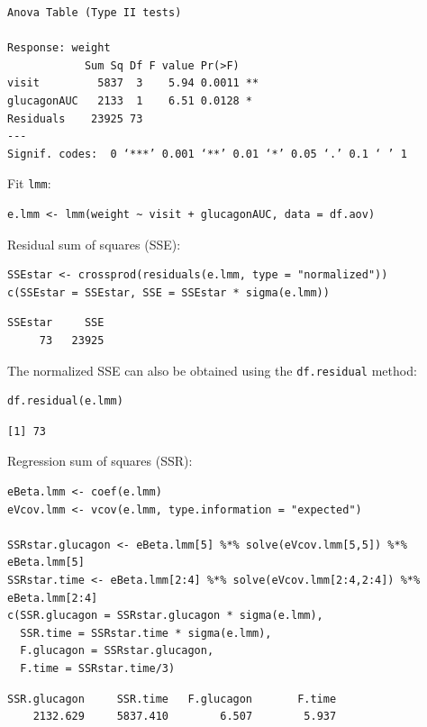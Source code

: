\documentclass[12pt]{article}
\begin{document}
\begin{verbatim}
Anova Table (Type II tests)

Response: weight
            Sum Sq Df F value Pr(>F)   
visit         5837  3    5.94 0.0011 **
glucagonAUC   2133  1    6.51 0.0128 * 
Residuals    23925 73                  
---
Signif. codes:  0 ‘***’ 0.001 ‘**’ 0.01 ‘*’ 0.05 ‘.’ 0.1 ‘ ’ 1
\end{verbatim}


Fit \texttt{lmm}:
\lstset{language=r,label= ,caption= ,captionpos=b,numbers=none}
\begin{lstlisting}
e.lmm <- lmm(weight ~ visit + glucagonAUC, data = df.aov)
\end{lstlisting}

Residual sum of squares (SSE):
\lstset{language=r,label= ,caption= ,captionpos=b,numbers=none}
\begin{lstlisting}
SSEstar <- crossprod(residuals(e.lmm, type = "normalized"))
c(SSEstar = SSEstar, SSE = SSEstar * sigma(e.lmm))
\end{lstlisting}

\begin{verbatim}
SSEstar     SSE 
     73   23925
\end{verbatim}


The normalized SSE can also be obtained using the \texttt{df.residual} method:
\lstset{language=r,label= ,caption= ,captionpos=b,numbers=none}
\begin{lstlisting}
df.residual(e.lmm)
\end{lstlisting}

\begin{verbatim}
[1] 73
\end{verbatim}


Regression sum of squares (SSR):
\lstset{language=r,label= ,caption= ,captionpos=b,numbers=none}
\begin{lstlisting}
eBeta.lmm <- coef(e.lmm)
eVcov.lmm <- vcov(e.lmm, type.information = "expected")

SSRstar.glucagon <- eBeta.lmm[5] %*% solve(eVcov.lmm[5,5]) %*% eBeta.lmm[5] 
SSRstar.time <- eBeta.lmm[2:4] %*% solve(eVcov.lmm[2:4,2:4]) %*% eBeta.lmm[2:4] 
c(SSR.glucagon = SSRstar.glucagon * sigma(e.lmm),
  SSR.time = SSRstar.time * sigma(e.lmm),
  F.glucagon = SSRstar.glucagon,
  F.time = SSRstar.time/3)
\end{lstlisting}

\begin{verbatim}
SSR.glucagon     SSR.time   F.glucagon       F.time 
    2132.629     5837.410        6.507        5.937
\end{verbatim}
\end{document}
